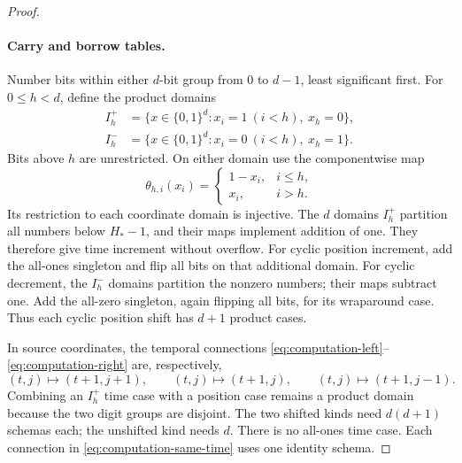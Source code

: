 \documentclass[11pt]{article}
\theoremstyle{definition}
\begin{document}
\begin{proof}
\paragraph{Carry and borrow tables.}
Number bits within either $d$-bit group from $0$ to $d-1$, least
significant first. For $0\le h<d$, define the product domains
\begin{align*}
 I_h^+&=\{x\in\{0,1\}^d:x_i=1\ (i<h),\ x_h=0\},\\
 I_h^-&=\{x\in\{0,1\}^d:x_i=0\ (i<h),\ x_h=1\}.
\end{align*}
Bits above $h$ are unrestricted. On either domain use the componentwise
map
\begin{equation}\label{eq:computation-bit-flip}
 \theta_{h,i}(x_i)=
 \begin{cases}
  1-x_i,&i\le h,\\
  x_i,&i>h.
 \end{cases}
\end{equation}
Its restriction to each coordinate domain is injective. The $d$ domains
$I_h^+$ partition all numbers below $H_*-1$, and their maps implement
addition of one. They therefore give time increment without overflow.
For cyclic position increment, add the all-ones singleton and flip all
bits on that additional domain. For cyclic decrement, the $I_h^-$
domains partition the nonzero numbers; their maps subtract one. Add the
all-zero singleton, again flipping all bits, for its wraparound case.
Thus each cyclic position shift has $d+1$ product cases.

In source coordinates, the temporal connections
\eqref{eq:computation-left}--\eqref{eq:computation-right} are, respectively,
\begin{equation}\label{eq:computation-source-maps}
 (t,j)\mapsto(t+1,j+1),\qquad
 (t,j)\mapsto(t+1,j),\qquad
 (t,j)\mapsto(t+1,j-1).
\end{equation}
Combining an $I_h^+$ time case with a position case remains a product
domain because the two digit groups are disjoint. The two shifted kinds
need $d(d+1)$ schemas each; the unshifted kind needs $d$. There is no
all-ones time case. Each connection in
\eqref{eq:computation-same-time} uses one identity schema.


\end{proof}
\end{document}
